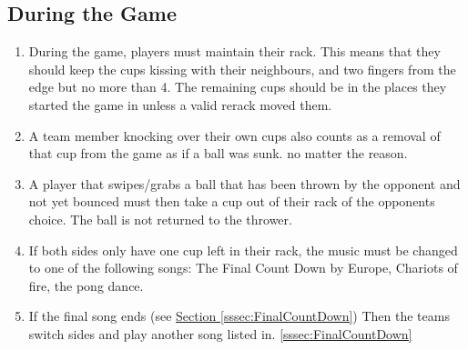 	\subsection{During the Game}\label{ssec:DuringGame}
		\begin{enumerate}[label=(\roman*)]
            \item \label{sssec:MaintainRack} During the game, players must maintain their rack.
                This means that they should keep the cups kissing with their neighbours, and two fingers from the edge but no more than 4.
                The remaining cups should be in the places they started the game in unless a valid rerack moved them.
            \item \label{sssec:Knockover} A team member knocking over their own cups also counts as a removal of that cup from the game as if a ball was sunk. no matter the reason.
            \item \label{sssec:swiping_no_bounce} A player that swipes/grabs a ball that has been thrown by the opponent and not yet bounced must then take a cup out of their rack of the opponents choice.
                The ball is not returned to the thrower.
            \item \label{sssec:FinalCountDown} If both sides only have one cup left in their rack, the music must be changed to one of the following songs: The Final Count Down by Europe, Chariots of fire, the pong dance.
            \item \label{sssec:finalSongEnd} If the final song ends (see \hyperref[sssec:FinalCountDown]{Section \ref{sssec:FinalCountDown}}) Then the teams switch sides and play another song listed in. \ref{sssec:FinalCountDown}
        \end{enumerate}